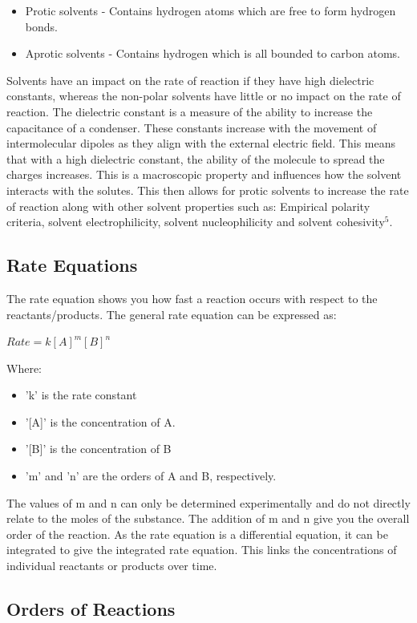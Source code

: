 \begin{itemize}
\item Protic solvents - Contains hydrogen atoms which are free to form hydrogen bonds.
\item Aprotic solvents - Contains hydrogen which is all bounded to carbon atoms.
\end{itemize}

Solvents have an impact on the  rate of reaction if they have high dielectric constants, whereas the non-polar solvents have little or no impact on the rate of reaction. The dielectric constant is a measure of the ability to increase the capacitance of a condenser. These constants increase with the movement of intermolecular dipoles as they align with the external electric field. This means that with a high dielectric constant, the ability of the molecule to spread the charges increases. This is a macroscopic property and influences how the solvent interacts with the solutes. This then allows for protic solvents to increase the rate of reaction along with other solvent properties such as: Empirical polarity criteria, solvent electrophilicity, solvent nucleophilicity and solvent cohesivity$^5$.

	\subsection{Rate Equations}

The rate equation shows you how fast a reaction occurs with respect to the reactants/products. The general rate equation can be expressed as:

$Rate = k[A]^m [B]^n$

Where:
\begin{itemize}
\item 'k' is the rate constant
\item '[A]' is the concentration of A.
\item '[B]' is the concentration of B
\item 'm' and 'n' are the orders of A and B, respectively.
\end{itemize}
The values of m and n can only be determined experimentally and do not directly relate to the moles of the substance. The addition of m and n give you the overall order of the reaction. As the rate equation is a differential equation, it can be integrated to give the integrated rate equation. This links the concentrations of individual reactants or products over time.


	\subsection{Orders of Reactions}

